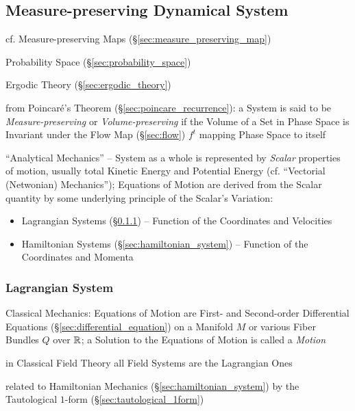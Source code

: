 \subsection{Measure-preserving Dynamical System}
\label{sec:measure_preserving_system}

\fist cf. Measure-preserving Maps (\S\ref{sec:measure_preserving_map})

Probability Space (\S\ref{sec:probability_space})

\fist Ergodic Theory (\S\ref{sec:ergodic_theory})

from Poincar\'e's Theorem (\S\ref{sec:poincare_recurrence}): a System is said to
be \emph{Measure-preserving} or \emph{Volume-preserving} if the Volume of a Set
in Phase Space is Invariant under the Flow Map (\S\ref{sec:flow}) $f^t$ mapping
Phase Space to itself

``Analytical Mechanics'' -- System as a whole is represented by \emph{Scalar}
properties of motion, usually total Kinetic Energy and Potential Energy (cf.
``Vectorial (Netwonian) Mechanics''); Equations of Motion are derived from the
Scalar quantity by some underlying principle of the Scalar's Variation:
\begin{itemize}
  \item Lagrangian Systems (\S\ref{sec:lagrangian_system}) -- Function of the
    Coordinates and Velocities
  \item Hamiltonian Systems (\S\ref{sec:hamiltonian_system}) -- Function of the
    Coordinates and Momenta
\end{itemize}



\subsubsection{Lagrangian System}\label{sec:lagrangian_system}

Classical Mechanics: Equations of Motion are First- and Second-order
Differential Equations (\S\ref{sec:differential_equation}) on a Manifold $M$ or
various Fiber Bundles $Q$ over $\mathbb{R}$; a Solution to the Equations of Motion
is called a \emph{Motion}

in Classical Field Theory all Field Systems are the Lagrangian Ones

related to Hamiltonian Mechanics (\S\ref{sec:hamiltonian_system}) by the
Tautological $1$-form (\S\ref{sec:tautological_1form})

